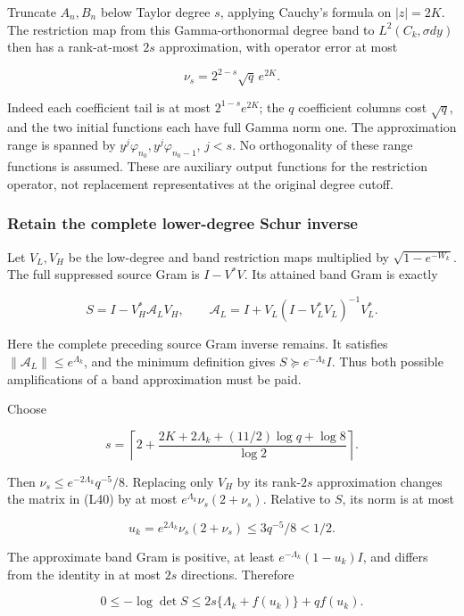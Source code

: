 Truncate \(A_n,B_n\) below Taylor degree \(s\), applying Cauchy's formula on \(|z|=2K\). The restriction map from this Gamma-orthonormal degree band to \(L^2(C_k,\sigma dy)\) then has a rank-at-most \(2s\) approximation, with operator error at most

\[
\nu_s=2^{2-s}\sqrt q\,e^{2K}.
\tag{L39}
\]

Indeed each coefficient tail is at most \(2^{1-s}e^{2K}\); the \(q\) coefficient columns cost \(\sqrt q\), and the two initial functions each have full Gamma norm one. The approximation range is spanned by
\(y^j\varphi_{n_0},y^j\varphi_{n_0-1}\), \(j<s\). No orthogonality of these range functions is assumed. These are auxiliary output functions for the restriction operator, not replacement representatives at the original degree cutoff.

\subsubsection{Retain the complete lower-degree Schur inverse}\label{loc:retain-the-complete-lower-degree-schur-inverse}

Let \(V_L,V_H\) be the low-degree and band restriction maps multiplied by \(\sqrt{1-e^{-W_k}}\). The full suppressed source Gram is \(I-V^*V\). Its attained band Gram is exactly

\[
\boxed{S=I-V_H^*\mathcal A_LV_H,\qquad
\mathcal A_L=I+V_L(I-V_L^*V_L)^{-1}V_L^*.}
\tag{L40}
\]

Here the complete preceding source Gram inverse remains. It satisfies
\(\|\mathcal A_L\|\le e^{\Lambda_k}\), and the minimum definition gives
\(S\succeq e^{-\Lambda_k}I\). Thus both possible amplifications of a band approximation must be paid.

Choose

\[
\boxed{s=\left\lceil 2+
\frac{2K+2\Lambda_k+(11/2)\log q+\log8}{\log2}\right\rceil.}
\tag{L41}
\]

Then \(\nu_s\le e^{-2\Lambda_k}q^{-5}/8\). Replacing only \(V_H\) by its rank-\(2s\) approximation changes the matrix in (L40) by at most
\(e^{\Lambda_k}\nu_s(2+\nu_s)\). Relative to \(S\), its norm is at most

\[
u_k=e^{2\Lambda_k}\nu_s(2+\nu_s)\le3q^{-5}/8<1/2.
\]

The approximate band Gram is positive, at least
\(e^{-\Lambda_k}(1-u_k)I\), and differs from the identity in at most \(2s\) directions. Therefore

\[
0\le-\log\det S\le2s\{\Lambda_k+f(u_k)\}+qf(u_k).
\tag{L42}
\]

